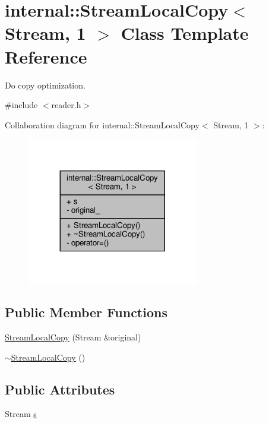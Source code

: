 \hypertarget{classinternal_1_1StreamLocalCopy_3_01Stream_00_011_01_4}{}\section{internal\+:\+:Stream\+Local\+Copy$<$ Stream, 1 $>$ Class Template Reference}
\label{classinternal_1_1StreamLocalCopy_3_01Stream_00_011_01_4}


Do copy optimization.  




{\ttfamily \#include $<$reader.\+h$>$}



Collaboration diagram for internal\+:\+:Stream\+Local\+Copy$<$ Stream, 1 $>$\+:
\nopagebreak
\begin{figure}[H]
\begin{center}
\leavevmode
\includegraphics[width=212pt]{classinternal_1_1StreamLocalCopy_3_01Stream_00_011_01_4__coll__graph}
\end{center}
\end{figure}
\subsection*{Public Member Functions}
\begin{DoxyCompactItemize}
\item 
\hyperlink{classinternal_1_1StreamLocalCopy_3_01Stream_00_011_01_4_aba475fed3eecc9f77ff059fdb7fe2a32}{Stream\+Local\+Copy} (Stream \&original)
\item 
\hyperlink{classinternal_1_1StreamLocalCopy_3_01Stream_00_011_01_4_ac13d9994e6c828536fedf698f5824687}{$\sim$\+Stream\+Local\+Copy} ()
\end{DoxyCompactItemize}
\subsection*{Public Attributes}
\begin{DoxyCompactItemize}
\item 
Stream \hyperlink{classinternal_1_1StreamLocalCopy_3_01Stream_00_011_01_4_a1d3e8ae8756325df25715d4ffb9c1b44}{s}
\end{DoxyCompactItemize}
